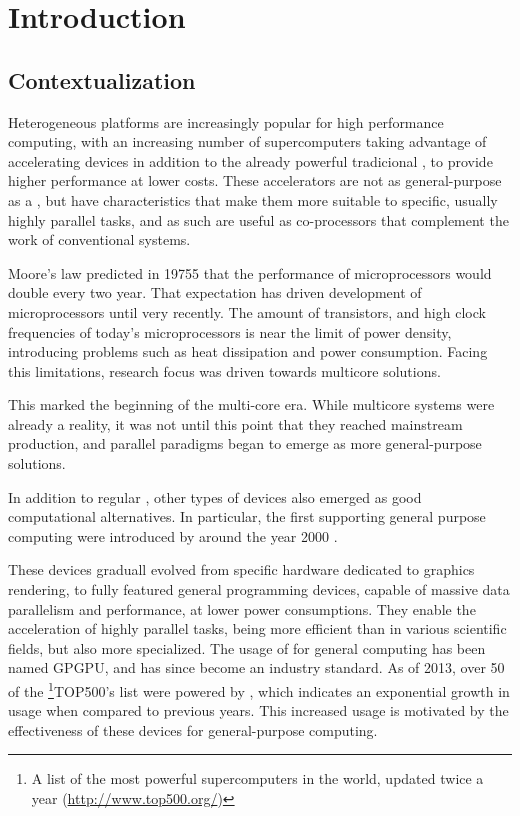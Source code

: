 \documentclass[main.tex]{subfiles}
\begin{document}
\chapter{Introduction}

\section{Contextualization}


Heterogeneous platforms are increasingly popular for high performance computing, with an increasing number of supercomputers taking advantage of accelerating devices in addition to the already powerful tradicional \cpus, to provide higher performance at lower costs. These accelerators are not as general-purpose as a \cpu, but have characteristics that make them more suitable to specific, usually highly parallel tasks, and as such are useful as co-processors that complement the work of conventional systems.

Moore's law \cite{moore1965cramming,moore1975progress} predicted in 19755 that the performance of microprocessors would double every two year. That expectation has driven development of microprocessors until very recently. The amount of transistors, and high clock frequencies of today's microprocessors is near the limit of power density, introducing problems such as heat dissipation and power consumption. Facing this limitations, research focus was driven towards multicore solutions.

This marked the beginning of the multi-core era. While multicore systems were already a reality, it was not until this point that they reached mainstream production, and parallel paradigms began to emerge as more general-purpose solutions.

In addition to regular \cpus, other types of devices also emerged as good computational alternatives. In particular, the first \gpus supporting general purpose computing were introduced by \nvidia around the year 2000 \cite{luebke2006gpgpu} .

These devices graduall evolved from specific hardware dedicated to graphics rendering, to fully featured general programming devices, capable of massive data parallelism and performance, at lower power consumptions.
They enable the acceleration of highly parallel tasks, being more efficient than \cpus in various scientific fields, but also more specialized. The usage of \gpus for general computing has been named \ac{GPGPU}, and has since become an industry standard.
As of 2013, over 50 of the \footnote{A list of the most powerful supercomputers in the world, updated twice a year (\url{http://www.top500.org/})}{TOP500's} list were powered by \gpus, which indicates an exponential growth in usage when compared to previous years. This increased usage is motivated by the effectiveness of these devices for general-purpose computing.
\end{document}
